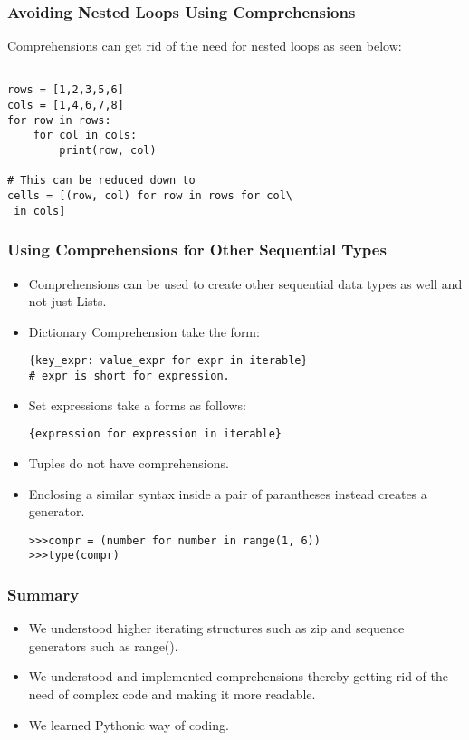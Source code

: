 \documentclass{beamer}
\begin{document}
\begin{frame}[fragile]
\frametitle{Avoiding Nested Loops Using Comprehensions}
Comprehensions can get rid of the need for nested loops as seen below:
\begin{lstlisting}

rows = [1,2,3,5,6]
cols = [1,4,6,7,8]
for row in rows:
    for col in cols:
        print(row, col)
        
# This can be reduced down to
cells = [(row, col) for row in rows for col\
 in cols]

\end{lstlisting}

\end{frame}

\begin{frame}[fragile]
\frametitle{Using Comprehensions for Other Sequential Types}
\begin{itemize}
\item Comprehensions can be used to create other sequential data types as well and not just Lists.
\item Dictionary Comprehension take the form:
\begin{lstlisting}
{key_expr: value_expr for expr in iterable}
# expr is short for expression.
\end{lstlisting}
\item Set expressions take a forms as follows:
\begin{lstlisting}
{expression for expression in iterable}
\end{lstlisting}
\item Tuples do not have comprehensions. 
\item Enclosing a similar syntax inside a pair of parantheses instead creates a generator.
\begin{lstlisting}
>>>compr = (number for number in range(1, 6))
>>>type(compr)
\end{lstlisting}
\end{itemize}
\end{frame}

\begin{frame}
\frametitle{Summary}
\begin{itemize}
\item We understood higher iterating structures such as zip and sequence generators such as range().
\item We understood and implemented comprehensions thereby getting rid of the need of complex code and making it more readable.
\item We learned Pythonic way of coding.
\end{itemize}
\end{frame}
\end{document}
